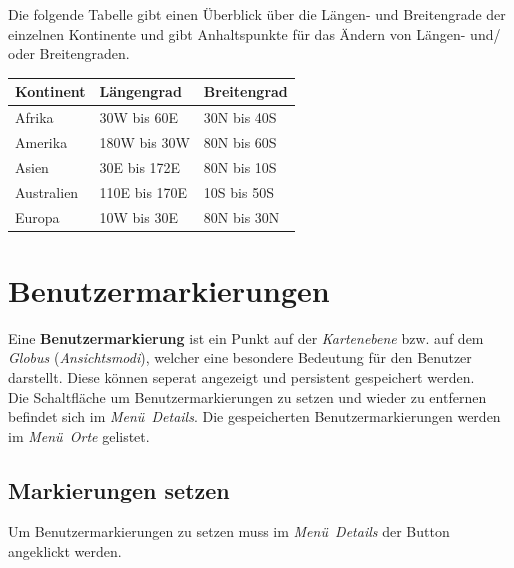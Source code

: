 \documentclass[10pt]{scrreprt}
\newcommand{\textref}[1]{\mbox{\raisebox{0.1ex}{\small$\rightarrow$ }\textit{#1}}}
\begin{document}
\vspace{5mm}
Die folgende Tabelle gibt einen Überblick über die Längen- und Breitengrade der einzelnen Kontinente und gibt Anhaltspunkte für das Ändern von Längen- und/ oder Breitengraden.

\vspace{3mm}
\begin{center}
\begin{tabular}{|>{\centering \arraybackslash}p{3cm}|>{\centering \arraybackslash}p{3cm}|>{\centering \arraybackslash}p{3cm}|}
\hline 
\rule[-1ex]{0pt}{4ex} \textbf{Kontinent} & \textbf{Längengrad} & \textbf{Breitengrad} \\ 
\hline
\hline
\rule[-1ex]{0pt}{4ex} Afrika & 30W bis 60E & 30N bis 40S\\
\hline
\rule[-1ex]{0pt}{4ex} Amerika & 180W bis 30W & 80N bis 60S \\
\hline
\rule[-1ex]{0pt}{4ex} Asien & 30E bis 172E & 80N bis 10S \\
\hline
\rule[-1ex]{0pt}{4ex} Australien & 110E bis 170E & 10S bis 50S \\
\hline
\rule[-1ex]{0pt}{4ex} Europa & 10W bis 30E & 80N bis 30N \\
\hline
\end{tabular}
\end{center}






\newpage
\section{Benutzermarkierungen} 
Eine \textbf{Benutzermarkierung} ist ein Punkt auf der \textref{Kartenebene} bzw. auf dem \textref{Globus} (\textref{Ansichtsmodi}), welcher eine besondere Bedeutung für den Benutzer darstellt. Diese können seperat angezeigt und persistent gespeichert werden.\\

Die Schaltfläche um Benutzermarkierungen zu setzen und wieder zu entfernen befindet sich im \textref{Menü Details}. Die gespeicherten Benutzermarkierungen werden im \textref{Menü Orte} gelistet.


\vspace{3mm}
\subsection{Markierungen setzen}  
Um Benutzermarkierungen zu setzen muss im \textref{Menü Details} der Button angeklickt werden.
\end{document}
